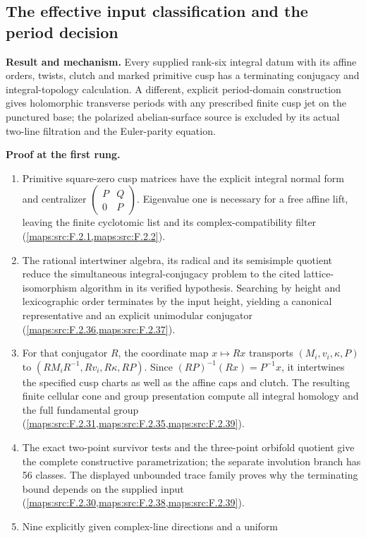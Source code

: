 \documentclass[11pt,a4paper]{article}
\theoremstyle{definition}
\newcommand{\RungZero}[1]{\par\noindent\textbf{Result and mechanism.} #1\par\smallskip}
\newcommand{\RungOne}{\par\Needspace{6\baselineskip}\noindent\textbf{Proof at the first rung.}\par\nobreak\smallskip}
\begin{document}
\subsection{The effective input classification and the period decision}
\RungZero{Every supplied rank-six integral datum with its affine
orders, twists, clutch and marked primitive cusp has a terminating
conjugacy and integral-topology calculation.  A different, explicit
period-domain construction gives holomorphic transverse periods with
any prescribed finite cusp jet on the punctured base; the polarized
abelian-surface source is excluded by its actual two-line filtration
and the Euler-parity equation.}
\RungOne
\begin{enumerate}[label=\arabic*.]
\item Primitive square-zero cusp matrices have the explicit integral
  normal form and centralizer
  $\left(\begin{smallmatrix}P&Q\\0&P\end{smallmatrix}\right)$.
  Eigenvalue one is necessary for a free affine lift, leaving the
  finite cyclotomic list and its complex-compatibility filter
  (\cref{maps:src:F.2.1,maps:src:F.2.2}).
\item The rational intertwiner algebra, its radical and its
  semisimple quotient reduce the simultaneous integral-conjugacy
  problem to the cited lattice-isomorphism algorithm in its verified
  hypothesis.  Searching by height and lexicographic order terminates
  by the input height, yielding a canonical representative and an
  explicit unimodular conjugator (\cref{maps:src:F.2.36,maps:src:F.2.37}).
\item For that conjugator $R$, the coordinate map $x\mapsto Rx$
  transports $(M_i,v_i,\kappa,P)$ to
  $(RM_iR^{-1},Rv_i,R\kappa,RP)$.  Since
  $(RP)^{-1}(Rx)=P^{-1}x$, it intertwines the specified cusp charts
  as well as the affine caps and clutch.  The resulting finite
  cellular cone and group presentation compute all integral homology
  and the full fundamental group (\cref{maps:src:F.2.31,maps:src:F.2.35,maps:src:F.2.39}).
\item The exact two-point survivor tests and the three-point
  orbifold quotient give the complete constructive parametrization;
  the separate involution branch has 56 classes.  The displayed
  unbounded trace family proves why the terminating bound depends on
  the supplied input (\cref{maps:src:F.2.30,maps:src:F.2.38,maps:src:F.2.39}).
\item Nine explicitly given complex-line directions and a uniform

\end{enumerate}
\end{document}
